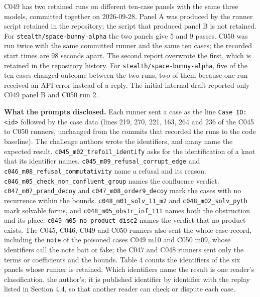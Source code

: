 \documentclass[
  11pt,
]{article}
\begin{document}
C049 has two retained runs on different ten-case panels with the same
three models, committed together on 2026-09-28. Panel A was produced by
the runner script retained in the repository; the script that produced
panel B is not retained. For
\texttt{stealth/\allowbreak{}space-\allowbreak{}bunny-\allowbreak{}alpha}
the two panels give 5 and 9 passes. C050 was run twice with the same
committed runner and the same ten cases; the recorded start times are 98
seconds apart. The second report overwrote the first, which is retained
in the repository history. For
\texttt{stealth/\allowbreak{}space-\allowbreak{}bunny-\allowbreak{}alpha},
five of the ten cases changed outcome between the two runs, two of them
because one run received an API error instead of a reply. The initial
internal draft reported only C049 panel B and C050 run 2.

\textbf{What the prompts disclosed.} Each runner sent a case as the line
\texttt{Case ID: <id>} followed by the case data (lines 219, 270, 221,
163, 264 and 236 of the C045 to C050 runners, unchanged from the commits
that recorded the runs to the code baseline). The challenge authors
wrote the identifiers, and many name the expected result.
\texttt{c045\_\allowbreak{}m02\_\allowbreak{}trefoil\_\allowbreak{}identify}
asks for the identification of a knot that its identifier names.
\texttt{c045\_\allowbreak{}m09\_\allowbreak{}refusal\_\allowbreak{}corrupt\_\allowbreak{}edge}
and
\texttt{c046\_\allowbreak{}m08\_\allowbreak{}refusal\_\allowbreak{}commutativity}
name a refusal and its reason.
\texttt{c046\_\allowbreak{}m05\_\allowbreak{}check\_\allowbreak{}non\_\allowbreak{}confluent\_\allowbreak{}group}
names the confluence verdict.
\texttt{c047\_\allowbreak{}m07\_\allowbreak{}prand\_\allowbreak{}decoy}
and
\texttt{c047\_\allowbreak{}m08\_\allowbreak{}order9\_\allowbreak{}decoy}
mark the cases with no recurrence within the bounds.
\texttt{c048\_\allowbreak{}m01\_\allowbreak{}solv\_\allowbreak{}11\_\allowbreak{}m2}
and
\texttt{c048\_\allowbreak{}m02\_\allowbreak{}solv\_\allowbreak{}pyth}
mark solvable forms, and
\texttt{c048\_\allowbreak{}m05\_\allowbreak{}obstr\_\allowbreak{}inf\_\allowbreak{}111}
names both the obstruction and its place.
\texttt{c049\_\allowbreak{}m05\_\allowbreak{}no\_\allowbreak{}product\_\allowbreak{}disc2}
names the verdict that no product exists. The C045, C046, C049 and C050
runners also sent the whole case record, including the \texttt{note} of
the poisoned cases C049 m10 and C050 m09, whose identifiers call the
note bait or fake; the C047 and C048 runners sent only the terms or
coefficients and the bounds. Table 4 counts the identifiers of the six
panels whose runner is retained. Which identifiers name the result is
one reader's classification, the author's; it is published identifier by
identifier with the replay listed in Section 4.4, so that another reader
can check or dispute each case.
\end{document}
